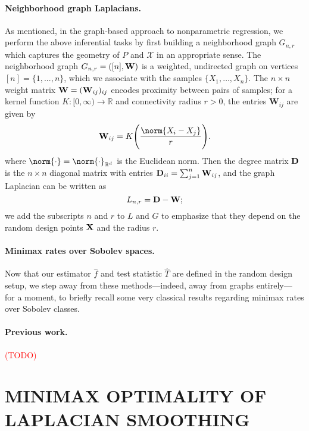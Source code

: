 \documentclass[twoside]{article}
\newcommand{\Reals}{\mathbb{R}}
\newcommand{\1}{\mathbf{1}}
\newcommand{\Rd}{\Reals^d}
\newcommand{\Lap}{L}
\newcommand{\mc}[1]{\mathcal{#1}}
\newcommand{\wh}[1]{\widehat{#1}}
\theoremstyle{definition}
\theoremstyle{remark}
\begin{document}
\paragraph{Neighborhood graph Laplacians.}
As mentioned, in the graph-based approach to nonparametric regression, we perform the above inferential tasks by first building a neighborhood graph $G_{n,r}$ which captures the geometry of $P$ and $\mc{X}$ in an appropriate sense. The neighborhood graph $G_{n,r} = ([n],{\bf W})$ is a weighted, undirected graph on vertices $[n] = \{1,...,n\}$, which we associate with the samples $\{X_1,\ldots,X_n\}$. The $n \times n$ weight matrix ${\bf W} = ({\bf W}_{ij})_{ij}$ encodes proximity between pairs of samples; for a kernel function $K: [0,\infty) \to \Reals$ and connectivity radius $r > 0$, the entries $\mathbf{W}_{ij}$ are given by
\begin{equation*}
\label{eqn:neighborhood_graph}
{\bf W}_{ij} = K\Biggl(\frac{\norm{X_i - X_j}}{r}\Biggr).
\end{equation*}
where $\norm{\cdot} = \norm{\cdot}_{\Rd}$ is the Euclidean norm. Then the degree matrix ${\bf D}$ is the $n \times n$ diagonal matrix with entries ${\bf D}_{ii} = \sum_{j = 1}^{n}{\bf W}_{ij}$, and the graph Laplacian can be written as
\begin{equation}
\label{eqn:graph_Laplacian}
\Lap_{n,r} = \bf{D} - \bf{W};
\end{equation}
we add the subscripts $n$ and $r$ to $\Lap$ and $G$ to emphasize that they depend on the random design points $\bf{X}$ and the radius $r$.

\paragraph{Minimax rates over Sobolev spaces.}
Now that our estimator $\wh{f}$ and test statistic $\wh{T}$ are defined in the random design setup, we step away from these methods---indeed, away from graphs entirely--- for a moment, to briefly recall some very classical results regarding minimax rates over Sobolev classes.



\paragraph{Previous work.}

\textcolor{red}{(TODO)}

\section{MINIMAX OPTIMALITY OF LAPLACIAN SMOOTHING}
\label{sec:minimax_optimal_laplacian_smoothing}
\end{document}
